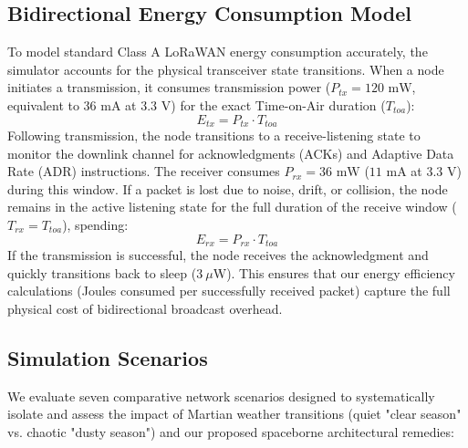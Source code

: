 \documentclass[journal,10pt,doublecolumn]{IEEEtran}
\begin{document}
\subsection{Bidirectional Energy Consumption Model}
To model standard Class A LoRaWAN energy consumption accurately, the simulator accounts for the physical transceiver state transitions. When a node initiates a transmission, it consumes transmission power ($P_{tx} = 120\text{ mW}$, equivalent to $36\text{ mA}$ at $3.3\text{ V}$) for the exact Time-on-Air duration ($T_{toa}$):
\begin{equation}
    E_{tx} = P_{tx} \cdot T_{toa}
\end{equation}
Following transmission, the node transitions to a receive-listening state to monitor the downlink channel for acknowledgments (ACKs) and Adaptive Data Rate (ADR) instructions. The receiver consumes $P_{rx} = 36\text{ mW}$ ($11\text{ mA}$ at $3.3\text{ V}$) during this window. If a packet is lost due to noise, drift, or collision, the node remains in the active listening state for the full duration of the receive window ($T_{rx} = T_{toa}$), spending:
\begin{equation}
    E_{rx} = P_{rx} \cdot T_{toa}
\end{equation}
If the transmission is successful, the node receives the acknowledgment and quickly transitions back to sleep ($3\ \mu\text{W}$). This ensures that our energy efficiency calculations (Joules consumed per successfully received packet) capture the full physical cost of bidirectional broadcast overhead.

\subsection{Simulation Scenarios}
We evaluate seven comparative network scenarios designed to systematically isolate and assess the impact of Martian weather transitions (quiet "clear season" vs. chaotic "dusty season") and our proposed spaceborne architectural remedies:
\end{document}
